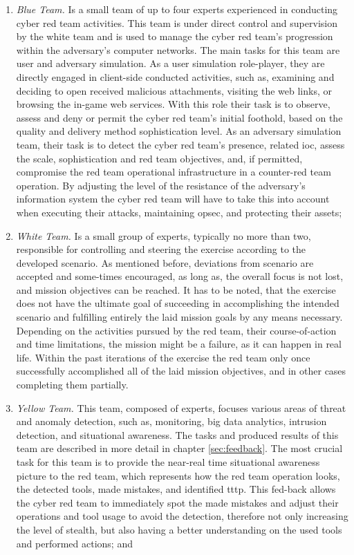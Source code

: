\begin{enumerate}
\begin{enumerate}
    \end{enumerate}
    \item \textit{Blue Team.} Is a small team of up to four experts experienced in conducting cyber red team activities. This team is under direct control and supervision by the white team and is used to manage the cyber red team's progression within the adversary's computer networks. The main tasks for this team are user and adversary simulation. As a user simulation role-player, they are directly engaged in client-side conducted activities, such as, examining and deciding to open received malicious attachments, visiting the web links, or browsing the in-game web services. With this role their task is to observe, assess and deny or permit the cyber red team's initial foothold, based on the quality and delivery method sophistication level. As an adversary simulation team, their task is to detect the cyber red team's presence, related \gls{ioc}, assess the scale, sophistication and red team objectives, and, if permitted, compromise the red team operational infrastructure in a counter-red team operation. By adjusting the level of the resistance of the adversary's information system the cyber red team will have to take this into account when executing their attacks, maintaining \gls{opsec}, and protecting their assets;
    \item \textit{White Team.} Is a small group of experts, typically no more than two, responsible for controlling and steering the exercise according to the developed scenario. As mentioned before, deviations from scenario are accepted and some-times encouraged, as long as, the overall focus is not lost, and mission objectives can be reached. It has to be noted, that the exercise does not have the ultimate goal of succeeding in accomplishing the intended scenario and fulfilling entirely the laid mission goals by any means necessary. Depending on the activities pursued by the red team, their course-of-action and time limitations, the mission might be a failure, as it can happen in real life. Within the past iterations of the exercise the red team only once successfully accomplished all of the laid mission objectives, and in other cases completing them partially.
    \item \textit{Yellow Team.} This team, composed of experts, focuses various areas of threat and anomaly detection, such as, monitoring, big data analytics, intrusion detection, and situational awareness. The tasks and produced results of this team are described in more detail in chapter \ref{sec:feedback}. The most crucial task for this team is to provide the near-real time situational awareness picture to the red team, which represents how the red team operation looks, the detected tools, made mistakes, and identified \gls{tttp}. This fed-back allows the cyber red team to immediately spot the made mistakes and adjust their operations and tool usage to avoid the detection, therefore not only increasing the level of stealth, but also having a better understanding on the used tools and performed actions; and

\end{enumerate}
